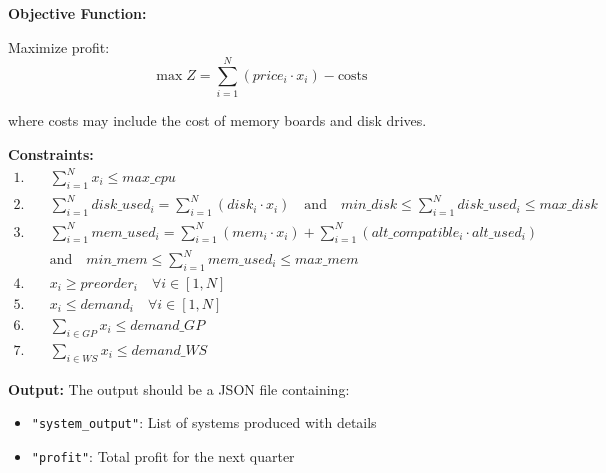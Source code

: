 \documentclass{article}
\begin{document}
\textbf{Objective Function:}

Maximize profit:
\[
\max Z = \sum_{i=1}^{N} (price_i \cdot x_i) - \text{costs}
\]

where costs may include the cost of memory boards and disk drives.

\textbf{Constraints:}
\begin{align*}
1. & \quad \sum_{i=1}^{N} x_i \leq max\_cpu \tag{CPU constraint}\\
2. & \quad \sum_{i=1}^{N} disk\_used_i = \sum_{i=1}^{N} (disk_i \cdot x_i) \quad \text{and}\quad min\_disk \leq \sum_{i=1}^{N} disk\_used_i \leq max\_disk \tag{Disk constraint}\\
3. & \quad \sum_{i=1}^{N} mem\_used_i = \sum_{i=1}^{N} (mem_i \cdot x_i) + \sum_{i=1}^{N} (alt\_compatible_i \cdot alt\_used_i) \\ 
   & \quad \text{and} \quad min\_mem \leq \sum_{i=1}^{N} mem\_used_i \leq max\_mem \tag{Memory constraint}\\
4. & \quad x_i \geq preorder_i \quad \forall i \in [1, N] \tag{Preorder constraint}\\
5. & \quad x_i \leq demand_i \quad \forall i \in [1, N] \tag{Demand constraint}\\
6. & \quad \sum_{i \in GP} x_i \leq demand\_GP \tag{GP demand constraint}\\
7. & \quad \sum_{i \in WS} x_i \leq demand\_WS \tag{WS demand constraint}
\end{align*}

\textbf{Output:}
The output should be a JSON file containing:
\begin{itemize}
    \item \texttt{"system\_output"}: List of systems produced with details
    \item \texttt{"profit"}: Total profit for the next quarter
\end{itemize}
\end{document}
